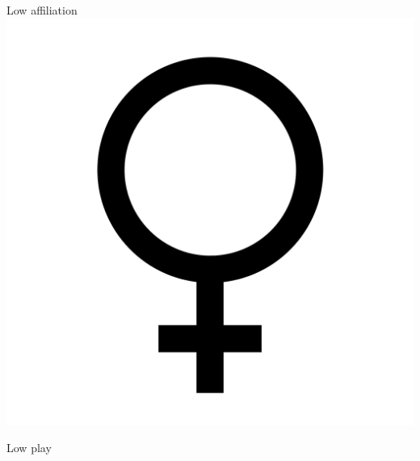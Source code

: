 \documentclass[aspectratio=169]{beamer}
\begin{document}
\begin{frame}
  \begin{center}
    \Huge Low affiliation \\
    \includegraphics[scale=.025]{./assets/women.png}
    \\ \small \cite{langford93}
  \end{center}
\end{frame}

\begin{frame}
  \begin{center}
    \Huge Low play
    \\ \small \cite{langford93}
  \end{center}
\end{frame}
\end{document}
